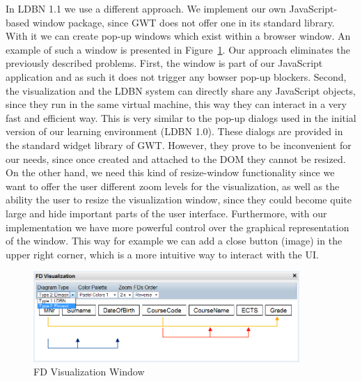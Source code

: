 In LDBN 1.1 we use a different approach. We implement our own 
JavaScript-based window package, since GWT does not offer one in its standard library.
With it we can create pop-up windows which exist within a browser window. 
An example of such a window is presented in Figure~\ref{fig:fd-visual-win}. 
Our approach eliminates the previously described problems. First,
the window is part of our JavaScript application and as such it does not 
trigger any bowser pop-up blockers. 
Second, the visualization and the LDBN system can directly share any 
JavaScript objects, since they run in the same virtual machine, 
this way they can interact in a very fast and efficient way. 
This is very similar to the pop-up dialogs used in the initial version of our learning environment (LDBN 1.0). 
These dialogs are provided in the standard widget library of GWT. 
However, they prove to be inconvenient for our needs, since once created and attached 
to the DOM they cannot be resized. On the other hand, we
need this kind of resize-window functionality since we want to offer the user
different zoom levels for the visualization, as well as the ability the user to resize the
visualization window, since they could become quite large and hide important parts of the user 
interface. Furthermore, with our implementation we have more powerful control over
the graphical representation of the window. This way for example we can add a close button (image)
in the upper right corner, which is a more intuitive way to interact with the UI.

\begin{figure}[ht]
	\begin{center}
		\includegraphics[width=0.9\textwidth]{./img/fd-visual-win.png}
		\caption{FD Visualization Window}
		\label{fig:fd-visual-win}
	\end{center}
\end{figure}

